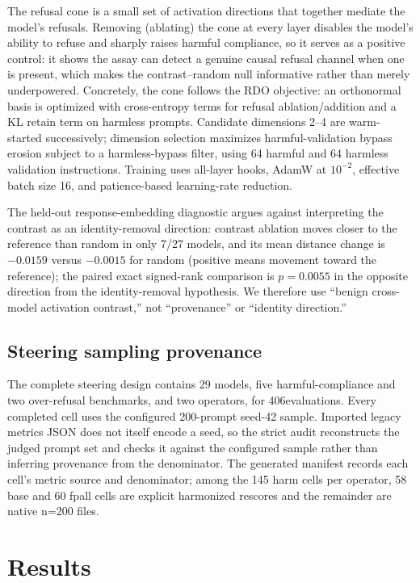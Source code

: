 \documentclass[letterpaper]{article}
\newcommand{\SteeringEvaluations}{406}
\begin{document}
The refusal cone is a small set of activation directions that together mediate the model's
refusals. Removing (ablating) the cone at every layer disables the model's ability to refuse
and sharply raises harmful compliance, so it serves as a positive control: it shows the assay
can detect a genuine causal refusal channel when one is present, which makes the
contrast--random null informative rather than merely underpowered. Concretely, the cone
follows the RDO objective: an orthonormal basis is optimized with
cross-entropy terms for refusal ablation/addition and a KL retain term on harmless
prompts. Candidate dimensions 2--4 are warm-started successively; dimension selection
maximizes harmful-validation bypass erosion subject to a harmless-bypass filter, using
64 harmful and 64 harmless validation instructions. Training uses all-layer hooks,
AdamW at $10^{-2}$, effective batch size 16, and patience-based learning-rate reduction.

The held-out response-embedding diagnostic argues against interpreting the contrast as an
identity-removal direction: contrast ablation moves closer to the reference
than random in only 7/27 models, and its mean distance change is $-0.0159$ versus
$-0.0015$ for random (positive means movement toward the reference); the paired exact
signed-rank comparison is $p=0.0055$ in the opposite direction from the identity-removal
hypothesis. We therefore use
``benign cross-model activation contrast,'' not ``provenance'' or ``identity direction.''

\subsection{Steering sampling provenance}

The complete steering design contains 29 models, five harmful-compliance and two
over-refusal benchmarks, and two operators, for \SteeringEvaluations evaluations. Every completed cell
uses the configured 200-prompt seed-42 sample. Imported legacy metrics JSON does not
itself encode a seed, so the strict audit reconstructs the judged prompt set and checks
it against the configured sample rather than inferring provenance from the denominator. The generated manifest records each cell's
metric source and denominator; among the 145 harm cells per operator, 58 base and 60
fpall cells are explicit harmonized rescores and the remainder are native n=200 files.

\section{Results}
\end{document}
